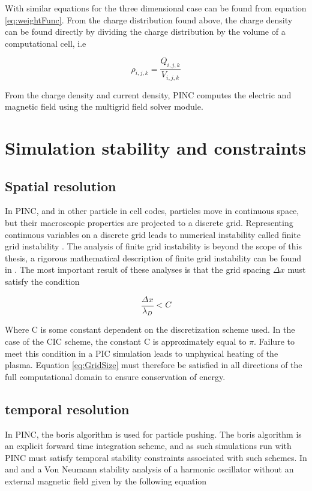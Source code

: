 With similar equations for the three dimensional case can be found from equation \ref{eq:weightFunc}. From the charge distribution found above, the charge density can be found directly by dividing the charge distribution by the volume of a computational cell, i.e 

\begin{equation*}
    \rho_{i,j,k} = \frac{Q_{i,j,k}}{V_{i,j,k}}
\end{equation*}

From the charge density and current density, PINC computes the electric and magnetic field using the multigrid field solver module.

\section{Simulation stability and constraints}

\subsection{Spatial resolution}
In PINC, and in other particle in cell codes, particles move in continuous space, but their macroscopic properties are projected to a discrete grid. Representing continuous variables on a discrete grid leads to numerical instability called finite grid instability . The analysis of finite grid instability is beyond the scope of this thesis, a rigorous mathematical description of finite grid instability can be found in . The most important result of these analyses is that the grid spacing $\Delta x$ must satisfy the condition

\begin{equation}\label{eq:GridSize}
    \frac{\Delta x}{\lambda_D} < C
\end{equation}


Where C is some constant dependent on the discretization scheme used. In the case of the CIC scheme, the constant C is approximately equal to $\pi$. Failure to meet this condition in a PIC simulation leads to unphysical heating of the plasma. Equation \ref{eq:GridSize} must therefore be satisfied in all directions of the full computational domain to ensure conservation of energy.

\subsection{temporal resolution}
In PINC, the boris algorithm is used for particle pushing. The boris algorithm is an explicit forward time integration scheme, and as such simulations run with PINC must satisfy temporal stability constraints associated with such schemes. In  and  and  a Von Neumann stability analysis of a harmonic oscillator without an external magnetic field given by the following equation

